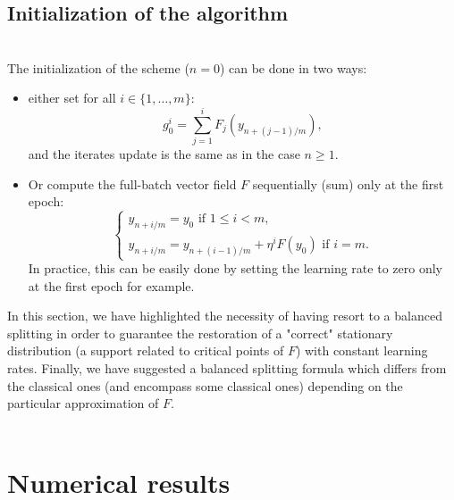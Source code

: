 \documentclass[article,authoryear,jmlmc]{beg_32}             %
\begin{document}
\subsection{Initialization of the algorithm}
~~\\
The initialization of the scheme ($n=0$) can be done in two ways:
\begin{itemize}
	\item either set for all $i\in \{1,\dots,m\}$:
	\begin{equation*}
		g_0^i = \sum_{j=1}^i F_j\left(y_{n+(j-1)/m}\right),
	\end{equation*}
	and the iterates update is the same as in the case $n\geq 1$.
	\item Or compute the full-batch vector field $F$ sequentially (sum) only at the first epoch:
	\begin{equation*}
		\left\{
		\begin{array}{ll}
			y_{n+i/m}=y_0 \text{ if } 1\leq i<m, \\
			y_{n+i/m} = y_{n+(i-1)/m}+\eta^i F(y_0) \text{ if } i=m.
		\end{array}
		\right.
	\end{equation*}
        In practice, this can be easily done by setting the learning rate to zero only at the first epoch for example. 
\end{itemize}



In this section, we have highlighted the necessity of having resort to a balanced splitting in order to guarantee the restoration of a "correct" stationary distribution (a support related to critical
points of $F$) with constant learning rates. Finally, we have suggested a balanced splitting formula which differs from the classical ones (and encompass some classical ones) %
depending on the particular approximation of $F$. 
\ \\ \ \\

\section{Numerical results}
\label{num_res}
\end{document}

